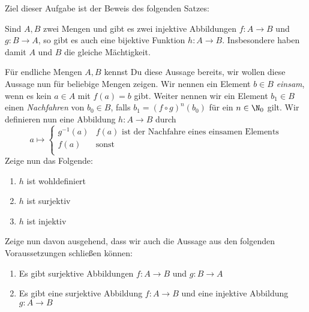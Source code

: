 \begin{prob}
  Ziel dieser Aufgabe ist der Beweis des folgenden Satzes:
  \begin{theorem*}
    Sind $A, B$ zwei Mengen und gibt es zwei injektive Abbildungen
    $f \colon A \to B$ und $g \colon B \to A$, so gibt es auch eine bijektive
    Funktion $h \colon A \to B$. Insbesondere haben damit $A$ und $B$ die
    gleiche Mächtigkeit.
  \end{theorem*}
  Für endliche Mengen $A, B$ kennst Du diese Aussage bereits, wir wollen diese
  Aussage nun für beliebige Mengen zeigen. Wir nennen ein Element $b \in B$
  \emph{einsam}, wenn es kein $a \in A$ mit $f(a) = b$ gibt. Weiter nennen wir
  ein Element $b_1 \in B$ einen \emph{Nachfahren} von $b_0 \in B$, falls
  $b_1 = (f \circ g)^n (b_0)$ für ein $n \in \N_0$ gilt. Wir definieren nun eine
  Abbildung $h \colon A \to B$ durch
  \[
    a \mapsto
    \begin{cases}
      g^{-1}(a) & f(a) \text{ ist der Nachfahre eines einsamen Elements} \\
      f(a)      & \text{sonst}                                           \\
    \end{cases}
  \]
  Zeige nun das Folgende:
  \begin{enumerate}[label=(\roman*)]
  \item $h$ ist wohldefiniert
  \item $h$ ist surjektiv
  \item $h$ ist injektiv
  \end{enumerate}
  Zeige nun davon ausgehend, dass wir auch die Aussage aus den folgenden
  Voraussetzungen schließen können:
  \begin{enumerate}
  \item Es gibt surjektive Abbildungen $f \colon A \to B$ und $g \colon B
    \to A$
  \item Es gibt eine surjektive Abbildung $f \colon A \to B$ und eine injektive
    Abbildung $g \colon A \to B$
  \end{enumerate}
\end{prob}

